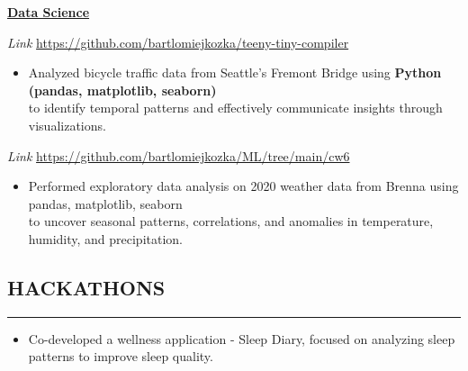 \documentclass[9pt]{extarticle}
\begin{document}
\vspace{0.2cm}
\noindent\textbf{\underline{Data Science}}
\vspace{0.1cm}

\noindent
{} 
    \textit{Link} \href{https://github.com/bartlomiejkozka/teeny-tiny-compiler}{https://github.com/bartlomiejkozka/teeny-tiny-compiler} 
    \begin{itemize}[itemsep=-3pt, topsep=3pt]
    \item Analyzed bicycle traffic data from Seattle’s Fremont Bridge using \textbf{Python (pandas, matplotlib, seaborn)} \\
        to identify temporal patterns and effectively communicate insights through visualizations.
\end{itemize}

\noindent
{}
    \textit{Link} \href{https://github.com/bartlomiejkozka/ML/tree/main/cw6}{https://github.com/bartlomiejkozka/ML/tree/main/cw6}
\begin{itemize}[itemsep=-3pt, topsep=3pt]
    \item Performed exploratory data analysis on 2020 weather data from Brenna using pandas, matplotlib, seaborn \\
        to uncover seasonal patterns, correlations, and anomalies in temperature, humidity, and precipitation.
\end{itemize}


\subsection*{HACKATHONS}
\vspace{-1.5em}
\rule{\textwidth}{0.1pt}
\vspace{-0.5em}

\noindent
{}
\begin{itemize}[itemsep=-3pt, topsep=3pt]
    \item Co-developed a wellness application - Sleep Diary, focused on analyzing sleep patterns to improve sleep quality.
\end{itemize}
\end{document}
